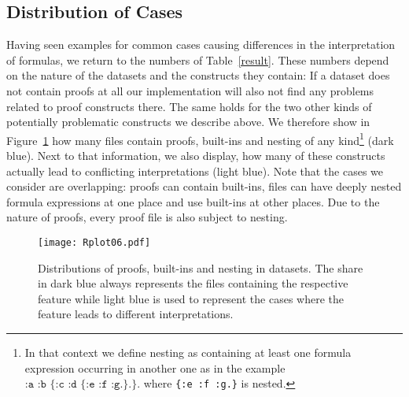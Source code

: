 \subsection{Distribution of Cases}\label{cases}
Having seen examples for common cases causing differences in the interpretation of \nthree formulas, we return to the numbers of Table~\ref{result}.
These numbers depend on the nature of the datasets and the constructs they contain: If a dataset does not contain proofs at all our implementation will also not find
 any problems related to proof constructs there. 
The same holds for the two other kinds of potentially problematic constructs we describe above. 
We therefore show in Figure~\ref{datasets} how many files contain proofs, built-ins and nesting of any kind\footnote{In that context we define
nesting as containing at least one formula expression occurring in another one as in the example
$\texttt{:a :b \{:c :d \{:e :f :g.\}.\}.}$
where \texttt{\{:e :f :g.\}} is nested.} (dark blue). 
Next to that information, we also display, how many of these constructs actually lead to conflicting interpretations
(light blue). %
%
Note that the cases we consider are overlapping: proofs can contain built-ins, 
files can have deeply nested formula expressions at one place and use built-ins at other places. Due to the nature of proofs, every proof file is also subject to nesting. 
\begin{figure}
 \texttt{[image: Rplot06.pdf]}
 \caption{Distributions of proofs, built-ins and nesting in datasets. The share in dark blue always represents the files containing the respective feature while light blue is used to represent the cases
 where the feature leads to different interpretations.\label{datasets}}
\end{figure}

